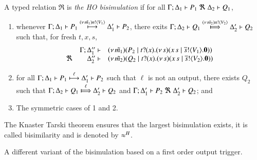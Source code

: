 \begin{definition}\rm
	\label{d:bisim}
A typed relation $\Re$ is {\em the HO bisimulation} if
for all $\horel{\Gamma}{\Delta_1}{P_1}{\ \Re \ }{\Delta_2}{Q_1}$, 
	\begin{enumerate}
		\item	whenever 
$\Gamma; \Delta_1 \vdash P_1 \stackrel{(\nu\, \tilde{m_1}) n ! \langle V_1 \rangle}{\longmapsto} \Delta_1' \vdash P_2$, there exits 
$\horel{\Gamma}{\Delta_2}{Q_1}{\Hby{\news{\tilde{m_2}} \bactout{n}{V_2}}}{\Delta_2'}{Q_2}$ such that, for fresh $t,x,s$, 
\[
\begin{array}{lrlll}
& \Gamma; \Delta''_1  \vdash & 
{(\nu\, \tilde{m_1})(P_2 \;|\; t ? (x) . (\nu\, s)(x\, {s} \;|\; \overline{s} ! \langle V_1 \rangle . \mathbf{0}))}\\ 
\Re & 
\Delta''_2 \vdash & {(\nu\, \tilde{m_2})(Q_2 \;|\; t ? (x) . (\nu\, s)(x\, {s} \;|\; \overline{s} ! \langle V_2 \rangle . \mathbf{0}))}
\end{array}
\]
		\item	
for all $\Gamma; \Delta_1 \vdash P_1 \stackrel{\ell}{\longmapsto} \Delta_1' \vdash P_2$ such that 
$\ell$ is not an output, 
 there exists $Q_2$ such that 
$\horel{\Gamma}{\Delta_2}{Q_1}{\Hby{\ell}}{\Delta_2'}{Q_2}$
			and
			$\horel{\Gamma}{\Delta_1'}{P_2}{\ \Re \ }{\Delta_2'}{Q_2}$; and 

                      \item	The symmetric cases of 1 and 2.                
	\end{enumerate}
	The Knaster Tarski theorem ensures that the largest bisimulation exists,
	it is called bisimilarity and is denoted by $\approx^H$.
\end{definition}


A different variant of the bisimulation based on a first order
output trigger.

